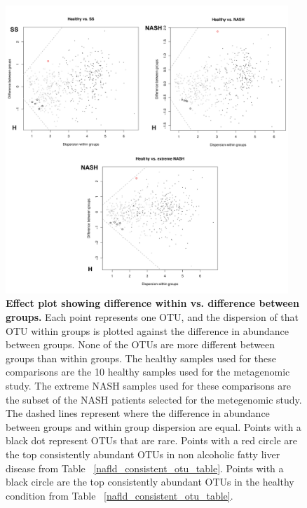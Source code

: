 \begin{figure}[h]
\begin{center}
\includegraphics[width=0.95\textwidth]{nafld_16s_aldex.png}
\caption[Effect plot showing difference within vs. difference between groups.]{\textbf{Effect plot showing difference within vs. difference between groups.} Each point represents one OTU, and the dispersion of that OTU within groups is plotted against the difference in abundance between groups. None of the OTUs are more different between groups than within groups. The healthy samples used for these comparisons are the 10 healthy samples used for the metagenomic study. The extreme NASH samples used for these comparisons are the subset of the NASH patients selected for the metegenomic study. The dashed lines represent where the difference in abundance between groups and within group dispersion are equal. Points with a black dot represent OTUs that are rare. Points with a red circle are the top consistently abundant OTUs in non alcoholic fatty liver disease from Table ~\ref{nafld_consistent_otu_table}. Points with a black circle are the top consistently abundant OTUs in the healthy condition from Table ~\ref{nafld_consistent_otu_table}.}
\label{nafld_fig3}
\end{center}
\end{figure}

